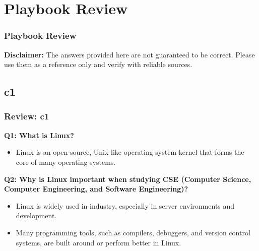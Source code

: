 \documentclass[
	11pt, %
]{beamer}
\begin{document}

\section{Playbook Review}

\begin{frame}
	\frametitle{Playbook Review}

	\textbf{Disclaimer:} The answers provided here are not guaranteed to be correct. Please use them as a reference only and verify with reliable sources.


\end{frame}


\subsection{c1}

\begin{frame}
	\frametitle{Review: c1}

	\textbf{Q1: What is Linux?}

	\begin{itemize}
	    \item Linux is an open-source, Unix-like operating system kernel that forms the core of many operating systems.
	\end{itemize}

	\vspace{0.5cm}
	
	\textbf{Q2: Why is Linux important when studying CSE (Computer Science, Computer Engineering, and Software Engineering)?}

	\begin{itemize}
	    \item Linux is widely used in industry, especially in server environments and development.
	    \item Many programming tools, such as compilers, debuggers, and version control systems, are built around or perform better in Linux.
	\end{itemize}

\end{frame}

\end{document}
